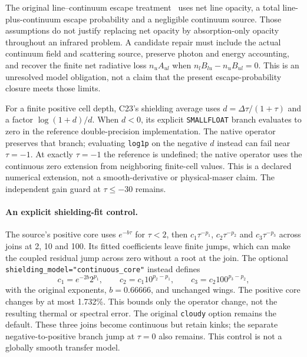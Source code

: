\documentclass[10pt,a4paper]{article}
\begin{document}
The original line--continuum escape treatment~\cite{netzer} uses net line
opacity, a total line-plus-continuum escape probability and a negligible
continuum source. Those assumptions do not justify replacing net opacity by
absorption-only opacity throughout an infrared problem. A candidate repair
must include the actual continuum field and scattering source, preserve
photon and energy accounting, and recover the finite net radiative loss
$n_u A_{ul}$ when $n_lB_{lu}-n_uB_{ul}=0$. This is an unresolved model
obligation, not a claim that the present escape-probability closure meets
those limits.

For a finite positive cell depth, C23's shielding average uses
$d=\Delta\tau/(1+\tau)$ and a factor $\log(1+d)/d$.
When $d<0$, its explicit \texttt{SMALLFLOAT} branch evaluates to zero in
the reference double-precision implementation. The native operator preserves
that branch; evaluating \texttt{log1p} on the negative $d$ instead can fail
near $\tau=-1$. At exactly $\tau=-1$ the reference is undefined; the native
operator uses the continuous zero extension from neighboring finite-cell
values. This is a declared numerical extension, not a smooth-derivative or
physical-maser claim. The independent gain guard at $\tau\leq-30$ remains.

\paragraph{An explicit shielding-fit control.}
The source's positive core uses $e^{-b\tau}$ for $\tau<2$, then
$c_1\tau^{-p_1}$, $c_2\tau^{-p_2}$ and $c_3\tau^{-p_3}$ across
joins at 2, 10 and 100. Its fitted coefficients leave finite jumps, which
can make the coupled residual jump across zero without a root at the join.
The optional \texttt{shielding\_model="continuous\_core"} instead defines
\begin{equation}
 c_1=e^{-2b}2^{p_1},\qquad
 c_2=c_1 10^{p_2-p_1},\qquad c_3=c_2 100^{p_3-p_2},
 \label{eq:connected_core}
\end{equation}
with the original exponents, $b=0.66666$, and unchanged wings. The positive
core changes by at most 1.732\%. This bounds only the operator change, not
the resulting thermal or spectral error. The original \texttt{cloudy}
option remains the default. These three joins become continuous but retain
kinks; the separate negative-to-positive branch jump at $\tau=0$ also
remains. This control is not a globally smooth transfer model.
\end{document}
